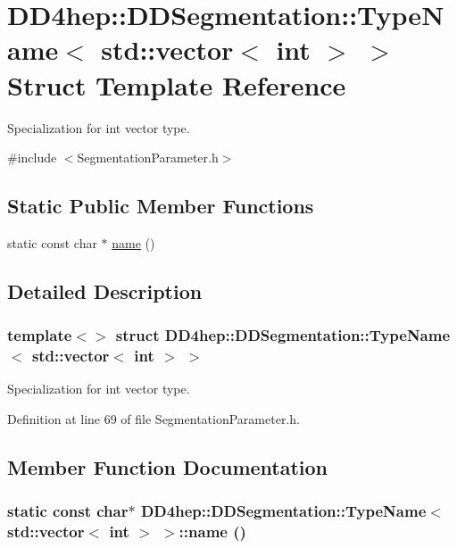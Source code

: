 \hypertarget{struct_d_d4hep_1_1_d_d_segmentation_1_1_type_name_3_01std_1_1vector_3_01int_01_4_01_4}{
\section{DD4hep::DDSegmentation::TypeName$<$ std::vector$<$ int $>$ $>$ Struct Template Reference}
\label{struct_d_d4hep_1_1_d_d_segmentation_1_1_type_name_3_01std_1_1vector_3_01int_01_4_01_4}
}


Specialization for int vector type.  


{\ttfamily \#include $<$SegmentationParameter.h$>$}\subsection*{Static Public Member Functions}
\begin{DoxyCompactItemize}
\item 
static const char $\ast$ \hyperlink{struct_d_d4hep_1_1_d_d_segmentation_1_1_type_name_3_01std_1_1vector_3_01int_01_4_01_4_a999a3441d585396df6bd32400a99a3e5}{name} ()
\end{DoxyCompactItemize}


\subsection{Detailed Description}
\subsubsection*{template$<$$>$ struct DD4hep::DDSegmentation::TypeName$<$ std::vector$<$ int $>$ $>$}

Specialization for int vector type. 

Definition at line 69 of file SegmentationParameter.h.

\subsection{Member Function Documentation}
\hypertarget{struct_d_d4hep_1_1_d_d_segmentation_1_1_type_name_3_01std_1_1vector_3_01int_01_4_01_4_a999a3441d585396df6bd32400a99a3e5}{
\subsubsection[{name}]{\setlength{\rightskip}{0pt plus 5cm}static const char$\ast$ {\bf DD4hep::DDSegmentation::TypeName}$<$ std::vector$<$ int $>$ $>$::name ()}}
\label{struct_d_d4hep_1_1_d_d_segmentation_1_1_type_name_3_01std_1_1vector_3_01int_01_4_01_4_a999a3441d585396df6bd32400a99a3e5}



